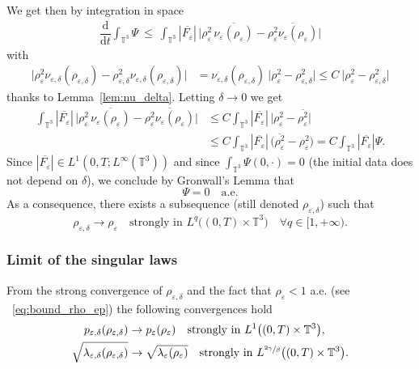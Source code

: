 \documentclass[10pt]{amsart}
\newcommand{\<}{\bigl\langle}
\renewcommand{\>}{\bigr\rangle}
\newcommand{\labeleq}[1]{}
\theoremstyle{definition}
\theoremstyle{remark}
\newcommand{\TT}{\mathbb{T}^3}
\newcommand{\Dt}{\dfrac{\mathrm{d}}{\mathrm{d} t}}
\let\ov\overline
\let\ep\varepsilon
\begin{document}
We get then by integration in space
\begin{align*}\labeleq{Psi2}
\Dt \int_{\TT}{\Psi}~ \leq ~ \int_{\TT}{ |\ov{ F_\ep }|\, \bigl| \rho_\ep^2 \,\ov{\nu_\ep(\rho_\ep)} - \ov{\rho_\ep^2 \nu_\ep(\rho_\ep)} \bigr|}
\end{align*}
with
\begin{align*}
\big|\rho_\ep^2 \nu_{\ep,\delta}(\rho_{\ep,\delta}) - \rho_{\ep,\delta}^2 \nu_{\ep,\delta}(\rho_{\ep,\delta})\big|
& = \nu_{\ep,\delta}(\rho_{\ep,\delta}) \ \big|\rho_{\ep}^2 - \rho_{\ep,\delta}^2 \big|
\leq C \ \big|\rho_{\ep}^2 - \rho_{\ep,\delta}^2 \big|
\end{align*}
thanks to Lemma~\ref{lem:nu_delta}.
Letting $\delta \rightarrow 0$ we get
\begin{align*}
\int_{\TT}{ |\ov{ F_\ep }|\, \bigl| \rho_\ep^2 \,\ov{\nu_\ep(\rho_\ep)} - \ov{\rho_\ep^2 \nu_\ep(\rho_\ep)} \bigr|}
& \leq C \int_{\TT}{ |\ov{ F_\ep }|\, \big|\rho_{\ep}^2 - \ov{\rho_\ep^2} \big|} \\
& \leq C \int_{\TT}{ |\ov{ F_\ep }|\, \big(\ov{\rho_{\ep}^2} - \rho_\ep^2 \big)}
= C \int_{\TT}{|\ov{ F_\ep }|\Psi}.
\end{align*}
Since $|\ov{F_\ep}| \in L^1(0,T;L^\infty(\TT))$ and since $\displaystyle \int_{\TT}{\Psi(0,\cdot)} = 0$ (the initial data does not depend on $\delta$),
we conclude by Gronwall's Lemma that
\[
\Psi = 0 \quad \text{a.e.}
\]
As a consequence, there exists a subsequence (still denoted $\rho_{\ep,\delta}$) such that
\begin{equation*}
\rho_{\ep,\delta} \to \rho_\ep \quad \text{strongly in } L^q\big((0,T) \times \TT\big) \quad\forall q \in [1, +\infty).
\end{equation*}

\subsubsection*{Limit of the singular laws}
From the strong convergence of $\rho_{\ep,\delta}$ and the fact that $\rho_\ep < 1$ a.e. (see ~\eqref{eq:bound_rho_ep}) the following convergences hold
\begin{align*}
p_{\ep,\delta}(\rho_{\ep,\delta}) &\to p_\ep(\rho_\ep) \quad \text{strongly in } L^{1}\big((0,T)\times \TT\big),\\
\sqrt{\lambda_{\ep,\delta}(\rho_{\ep,\delta})}&\to \sqrt{\lambda_\ep(\rho_\ep)} \quad \text{strongly in } L^{\sfrac{2\gamma}{\beta}}\big((0,T)\times \TT\big).
\end{align*}
\end{document}
